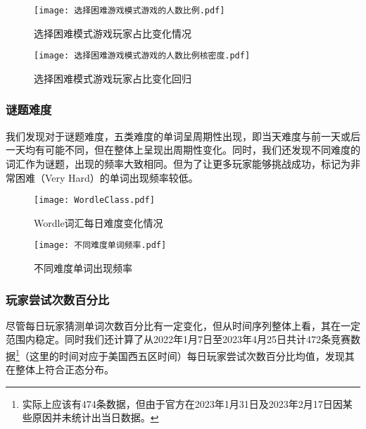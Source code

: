\documentclass{MathModeling}
\begin{document}
	\begin{figure}[H]
		\centering
		\begin{minipage}{0.48\linewidth}
			\centering
			\texttt{[image: 选择困难游戏模式游戏的人数比例.pdf]}
			\caption{选择困难模式游戏玩家占比变化情况}
			\label{fig:选择困难模式游戏玩家占比变化}
		\end{minipage}
		\begin{minipage}{0.48\linewidth}
			\centering
			\texttt{[image: 选择困难游戏模式游戏的人数比例核密度.pdf]}
			\caption{选择困难模式游戏玩家占比变化回归}
			\label{fig:选择困难模式游戏玩家占比变化回归}
		\end{minipage}
	\end{figure}

	\subsubsection{谜题难度}
	我们发现对于谜题难度，五类难度的单词呈周期性出现，即当天难度与前一天或后一天均有可能不同，但在整体上呈现出周期性变化。同时，我们还发现不同难度的词汇作为谜题，出现的频率大致相同。但为了让更多玩家能够挑战成功，标记为非常困难（Very Hard）的单词出现频率较低。

	\begin{figure}[H]
		\centering
		\begin{minipage}{0.48\linewidth}
			\centering
			\texttt{[image: WordleClass.pdf]}
			\caption{Wordle词汇每日难度变化情况}
			\label{fig:WordleClass}
		\end{minipage}
		\begin{minipage}{0.48\linewidth}
			\centering
			\texttt{[image: 不同难度单词频率.pdf]}
			\caption{不同难度单词出现频率}
			\label{fig:不同难度单词频率}
		\end{minipage}
	\end{figure}

	\subsubsection{玩家尝试次数百分比}
	尽管每日玩家猜测单词次数百分比有一定变化，但从时间序列整体上看，其在一定范围内稳定。同时我们还计算了从2022年1月7日至2023年4月25日共计472条竞赛数据\textcolor{blue}{\footnote{实际上应该有474条数据，但由于官方在2023年1月31日及2023年2月17日因某些原因并未统计出当日数据。}}（这里的时间对应于美国西五区时间）每日玩家尝试次数百分比均值，发现其在整体上符合正态分布。
\end{document}
